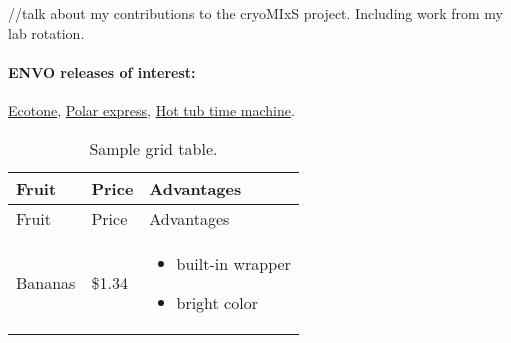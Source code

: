 \documentclass[]{article}
\providecommand{\tightlist}{%
  \setlength{\itemsep}{0pt}\setlength{\parskip}{0pt}}
\let\oldparagraph\paragraph
\renewcommand{\paragraph}[1]{\oldparagraph{#1}\mbox{}}
\begin{document}
//talk about my contributions to the cryoMIxS project. Including work
from my lab rotation.

\hypertarget{envo-releases-of-interest}{%
\paragraph{ENVO releases of interest:}\label{envo-releases-of-interest}}

\href{https://github.com/EnvironmentOntology/envo/releases/tag/v2017-05-10}{Ecotone},
\href{https://github.com/EnvironmentOntology/envo/releases/tag/v2017-04-15}{Polar
express},
\href{https://github.com/EnvironmentOntology/envo/releases/tag/v2017-03-27}{Hot
tub time machine}.

\begin{longtable}[]{@{}lll@{}}
\caption{Sample grid table.}\tabularnewline
\toprule
\begin{minipage}[b]{0.20\columnwidth}\raggedright
Fruit\strut
\end{minipage} & \begin{minipage}[b]{0.20\columnwidth}\raggedright
Price\strut
\end{minipage} & \begin{minipage}[b]{0.27\columnwidth}\raggedright
Advantages\strut
\end{minipage}\tabularnewline
\midrule
\endfirsthead
\toprule
\begin{minipage}[b]{0.20\columnwidth}\raggedright
Fruit\strut
\end{minipage} & \begin{minipage}[b]{0.20\columnwidth}\raggedright
Price\strut
\end{minipage} & \begin{minipage}[b]{0.27\columnwidth}\raggedright
Advantages\strut
\end{minipage}\tabularnewline
\midrule
\endhead
\begin{minipage}[t]{0.32\columnwidth}\raggedright
Bananas\strut
\end{minipage} & \begin{minipage}[t]{0.32\columnwidth}\raggedright
\$1.34\strut
\end{minipage} & \begin{minipage}[t]{0.32\columnwidth}\raggedright
\begin{itemize}
\tightlist
\item
  built-in wrapper
\item
  bright color
\end{itemize}\strut
\end{minipage}\tabularnewline

\end{longtable}
\end{document}
